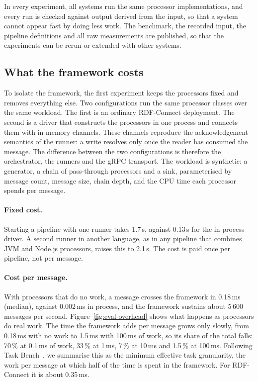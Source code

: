 In every experiment, all systems run the same processor implementations, and
every run is checked against output derived from the input, so that a system
cannot appear fast by doing less work. The benchmark, the recorded input, the
pipeline definitions and all raw measurements are published, so that the
experiments can be rerun or extended with other systems.

\subsection{What the framework costs}
\label{sec:eval-micro}

To isolate the framework, the first experiment keeps the processors fixed and
removes everything else. Two configurations run the same processor classes over
the same workload. The first is an ordinary RDF-Connect deployment. The second
is a driver that constructs the processors in one process and connects them with
in-memory channels. These channels reproduce the acknowledgement semantics of
the runner: a write resolves only once the reader has consumed the message. The
difference between the two configurations is therefore the orchestrator, the
runners and the gRPC transport. The workload is synthetic: a generator, a chain
of pass-through processors and a sink, parameterised by message count, message
size, chain depth, and the CPU time each processor spends per message.

\paragraph{Fixed cost.} Starting a pipeline with one runner takes 1.7\,s, against
0.13\,s for the in-process driver. A second runner in another language, as in
any pipeline that combines JVM and Node.js processors, raises this to 2.1\,s.
The cost is paid once per pipeline, not per message.

\paragraph{Cost per message.} With processors that do no work, a message
crosses the framework in 0.18\,ms (median), against 0.002\,ms in process, and
the framework sustains about 5\,600 messages per second. Figure~\ref{fig:eval-overhead}
shows what happens as processors do real work. The time the framework adds per
message grows only slowly, from 0.18\,ms with no work to 1.5\,ms with
100\,ms of work, so its share of the total falls: 70\,\% at 0.1\,ms of work,
33\,\% at 1\,ms, 7\,\% at 10\,ms and 1.5\,\% at 100\,ms.
Following Task Bench~\citep{slaughter2020}, we summarise this as the minimum
effective task granularity, the work per message at which half of the time is
spent in the framework. For RDF-Connect it is about 0.35\,ms.

